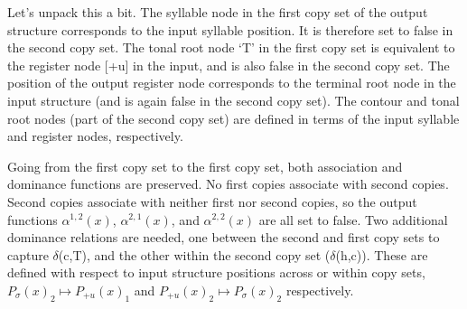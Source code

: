 \documentclass{article}
\begin{document}
\newpage
Let's unpack this a bit. The syllable node in the first copy set of the output structure corresponds to the input syllable position. It is therefore set to false in the second copy set. The tonal root node `T' in the first copy set is equivalent to the register node [+u] in the input, and is also false in the second copy set. The position of the output register node corresponds to the terminal root node in the input structure (and is again false in the second copy set). The contour and tonal root nodes (part of the second copy set) are defined in terms of the input syllable and register nodes, respectively.\par
Going from the first copy set to the first copy set, both association and dominance functions are preserved. No first copies associate with second copies. Second copies associate with neither first nor second copies, so the output functions $\alpha^{1,2}(x)$, $\alpha^{2,1}(x)$, and $\alpha^{2,2}(x)$ are all set to false. Two additional dominance relations are needed, one between the second and first copy sets to capture $\delta$(c,T), and the other within the second copy set ($\delta$(h,c)). These are defined with respect to input structure positions across or within copy sets, $P_{\sigma}(x)_{2}\mapsto P_{+u}(x)_{1}$ and $P_{+u}(x)_{2}\mapsto P_{\sigma}(x)_{2}$ respectively.
\end{document}
